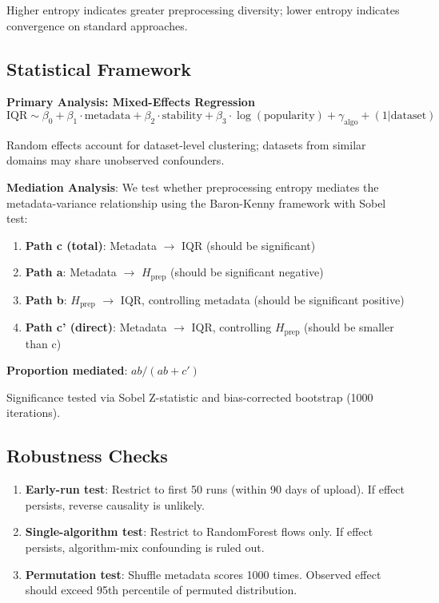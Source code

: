 Higher entropy indicates greater preprocessing diversity; lower entropy indicates convergence on standard approaches.

\subsection{Statistical Framework}

\textbf{Primary Analysis: Mixed-Effects Regression}
\begin{equation}
\text{IQR} \sim \beta_0 + \beta_1 \cdot \text{metadata} + \beta_2 \cdot \text{stability} + \beta_3 \cdot \log(\text{popularity}) + \gamma_{\text{algo}} + (1|\text{dataset})
\end{equation}

Random effects account for dataset-level clustering; datasets from similar domains may share unobserved confounders.

\textbf{Mediation Analysis}: We test whether preprocessing entropy mediates the metadata-variance relationship using the Baron-Kenny framework with Sobel test:

\begin{enumerate}
    \item \textbf{Path c (total)}: Metadata $\to$ IQR (should be significant)
    \item \textbf{Path a}: Metadata $\to$ $H_{\text{prep}}$ (should be significant negative)
    \item \textbf{Path b}: $H_{\text{prep}}$ $\to$ IQR, controlling metadata (should be significant positive)
    \item \textbf{Path c' (direct)}: Metadata $\to$ IQR, controlling $H_{\text{prep}}$ (should be smaller than c)
\end{enumerate}

\textbf{Proportion mediated}: $ab/(ab + c')$

Significance tested via Sobel Z-statistic and bias-corrected bootstrap (1000 iterations).

\subsection{Robustness Checks}

\begin{enumerate}
    \item \textbf{Early-run test}: Restrict to first 50 runs (within 90 days of upload). If effect persists, reverse causality is unlikely.
    \item \textbf{Single-algorithm test}: Restrict to RandomForest flows only. If effect persists, algorithm-mix confounding is ruled out.
    \item \textbf{Permutation test}: Shuffle metadata scores 1000 times. Observed effect should exceed 95th percentile of permuted distribution.
\end{enumerate}

